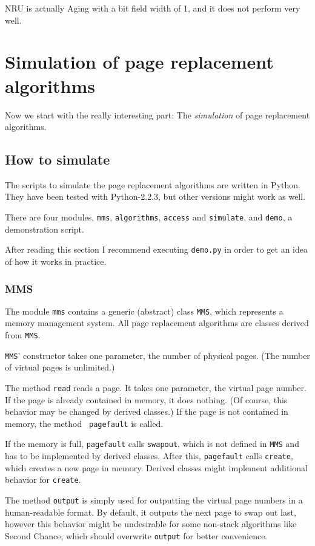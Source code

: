 \documentclass[a4paper,12pt,BCOR2cm,DIV12]{scrartcl}
\begin{document}
NRU is actually Aging with a bit field width of 1, and it does not
perform very well.

\section{Simulation of page replacement algorithms}

Now we start with the really interesting part: The \emph{simulation}
of page replacement algorithms.

\subsection{How to simulate}

The scripts to simulate the page replacement algorithms are written in
Python.  They have been tested with Python-2.2.3, but other versions
might work as well.

There are four modules, {\tt mms}, {\tt algorithms}, {\tt access} and
{\tt simulate}, and {\tt demo}, a demonstration script.

After reading this section I recommend executing {\tt demo.py} in
order to get an idea of how it works in practice.

\subsubsection{MMS}

The module {\tt mms} contains a generic (abstract) class {\tt MMS},
which represents a memory management system.  All page replacement
algorithms are classes derived from {\tt MMS}.

{\tt MMS}' constructor takes one parameter, the number of physical
pages.  (The number of virtual pages is unlimited.)

The method {\tt read} reads a page.  It takes one parameter, the
virtual page number.  If the page is already contained in memory, it
does nothing.  (Of course, this behavior may be changed by derived
classes.)  If the page is not contained in memory, the method {\tt
pagefault} is called.

If the memory is full, {\tt pagefault} calls {\tt swapout}, which is
not defined in {\tt MMS} and has to be implemented by derived classes.
After this, {\tt pagefault} calls {\tt create}, which creates a new page in
memory.  Derived classes might implement additional behavior for
{\tt create}.

The method {\tt output} is simply used for outputting the virtual page
numbers in a human-readable format.  By default, it outputs the next
page to swap out last, however this behavior might be undesirable for
some non-stack algorithms like Second Chance, which should overwrite
{\tt output} for better convenience.
\end{document}
